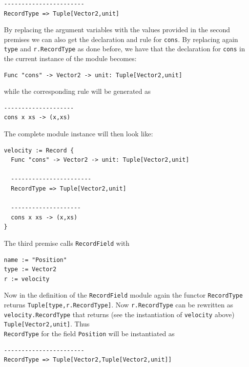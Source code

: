 \begin{lstlisting}
-----------------------
RecordType => Tuple[Vector2,unit]
\end{lstlisting}

By replacing the argument variables with the values provided in the second premises we can also get the declaration and rule for \texttt{cons}. By replacing again \texttt{type} and \texttt{r.RecordType} as done before, we have that the declaration for \texttt{cons} in the current instance of the module becomes:

\begin{lstlisting}
Func "cons" -> Vector2 -> unit: Tuple[Vector2,unit]
\end{lstlisting}

\noindent
while the corresponding rule will be generated as

\begin{lstlisting}
--------------------
cons x xs -> (x,xs)
\end{lstlisting}

\noindent
The complete module instance will then look like:

\begin{lstlisting}
velocity := Record {
  Func "cons" -> Vector2 -> unit: Tuple[Vector2,unit]
  
  -----------------------
  RecordType => Tuple[Vector2,unit]
  
  --------------------
  cons x xs -> (x,xs)
}
\end{lstlisting}

The third premise calls \texttt{RecordField} with 

\begin{lstlisting}
name := "Position"
type := Vector2
r := velocity
\end{lstlisting}

\noindent
Now in the definition of the \texttt{RecordField} module again the functor \texttt{RecordType} returns \texttt{Tuple[type,r.RecordType]}. Now \texttt{r.RecordType} can be rewritten as \texttt{velocity.RecordType} that returns (see the instantiation of \texttt{velocity} above) \texttt{Tuple[Vector2,unit]}. Thus\\ \texttt{RecordType} for the field \texttt{Position} will be instantiated as

\begin{lstlisting}
-----------------------
RecordType => Tuple[Vector2,Tuple[Vector2,unit]]
\end{lstlisting}

